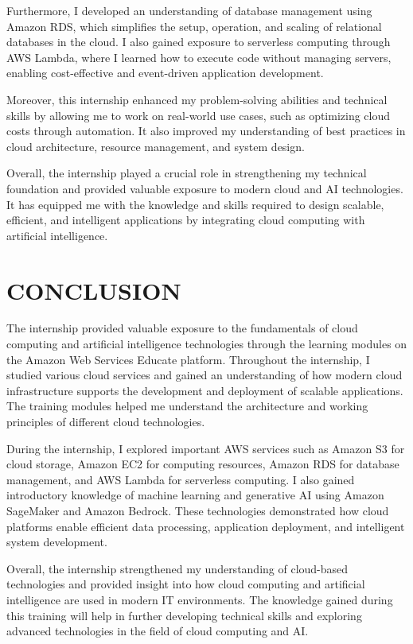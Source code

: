 \documentclass[12pt, a4paper, oneside]{report}
\begin{document}
Furthermore, I developed an understanding of database management using Amazon RDS, which simplifies the setup, operation, and scaling of relational databases in the cloud. I also gained exposure to serverless computing through AWS Lambda, where I learned how to execute code without managing servers, enabling cost-effective and event-driven application development.


Moreover, this internship enhanced my problem-solving abilities and technical skills by allowing me to work on real-world use cases, such as optimizing cloud costs through automation. It also improved my understanding of best practices in cloud architecture, resource management, and system design.

Overall, the internship played a crucial role in strengthening my technical foundation and provided valuable exposure to modern cloud and AI technologies. It has equipped me with the knowledge and skills required to design scalable, efficient, and intelligent applications by integrating cloud computing with artificial intelligence.


\chapter{CONCLUSION}

The internship provided valuable exposure to the fundamentals of cloud computing and 
artificial intelligence technologies through the learning modules on the Amazon Web 
Services Educate platform. Throughout the internship, I studied various cloud services 
and gained an understanding of how modern cloud infrastructure supports the 
development and deployment of scalable applications. The training modules helped me 
understand the architecture and working principles of different cloud technologies.

During the internship, I explored important AWS services such as Amazon S3 for cloud 
storage, Amazon EC2 for computing resources, Amazon RDS for database management, 
and AWS Lambda for serverless computing. I also gained introductory knowledge of 
machine learning and generative AI using Amazon SageMaker and Amazon Bedrock. 
These technologies demonstrated how cloud platforms enable efficient data processing, 
application deployment, and intelligent system development.

Overall, the internship strengthened my understanding of cloud-based technologies and 
provided insight into how cloud computing and artificial intelligence are used in modern 
IT environments. The knowledge gained during this training will help in further 
developing technical skills and exploring advanced technologies in the field of cloud 
computing and AI.
\end{document}
